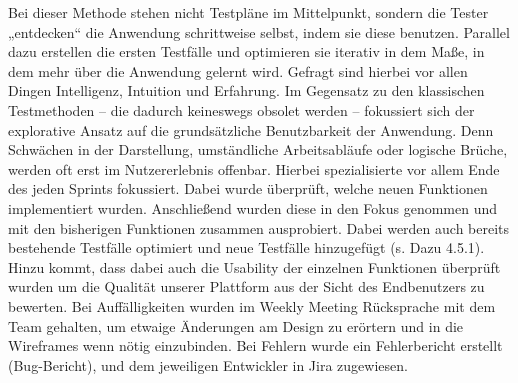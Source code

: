 Bei dieser Methode stehen nicht Testpläne im Mittelpunkt, sondern die Tester „entdecken“ die Anwendung schrittweise selbst, indem sie diese benutzen. Parallel dazu erstellen die ersten Testfälle und optimieren sie iterativ in dem Maße, in dem mehr über die Anwendung gelernt wird. Gefragt sind hierbei vor allen Dingen Intelligenz, Intuition und Erfahrung. Im Gegensatz zu den klassischen Testmethoden – die dadurch keineswegs obsolet werden – fokussiert sich der explorative Ansatz auf die grundsätzliche Benutzbarkeit der Anwendung. Denn Schwächen in der Darstellung, umständliche Arbeitsabläufe oder logische Brüche, werden oft erst im Nutzererlebnis offenbar.
Hierbei spezialisierte vor allem Ende des jeden Sprints fokussiert. Dabei wurde überprüft, welche neuen Funktionen implementiert wurden. Anschließend wurden diese in den Fokus genommen und mit den bisherigen Funktionen zusammen ausprobiert. Dabei werden auch bereits bestehende Testfälle optimiert und neue Testfälle hinzugefügt (s. Dazu 4.5.1). Hinzu kommt, dass dabei auch die Usability der einzelnen Funktionen überprüft wurden um die Qualität unserer Plattform aus der Sicht des Endbenutzers zu bewerten.
Bei Auffälligkeiten wurden im Weekly Meeting Rücksprache mit dem Team gehalten, um etwaige Änderungen am Design zu erörtern und in die Wireframes wenn nötig einzubinden.
Bei Fehlern wurde ein Fehlerbericht erstellt (Bug-Bericht), und dem jeweiligen Entwickler in Jira zugewiesen.
